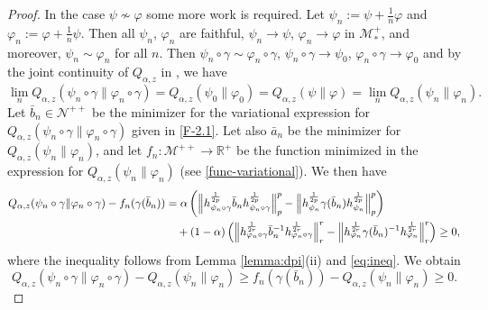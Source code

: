 \documentclass[12pt]{article}
\theoremstyle{definition}
\theoremstyle{remark}
\numberwithin{equation}{section}
\def\Me{\mathcal M}
\def\Ne{\mathcal N}
\def\ffi{\varphi}
\begin{document}
\begin{proof}
In the case $\psi\not\sim \ffi$ some more work is required. Let $\psi_n:=\psi+\frac1n \ffi$ and
$\ffi_n:=\ffi+\frac1n \psi$. Then all $\psi_n$, $\ffi_n$ are faithful,  $\psi_n\to \psi$, $\ffi_n\to \ffi$ in
$\Me_*^+$, {and} moreover,  $\psi_n\sim \ffi_n$ for all $n$. Then
$\psi_n\circ\gamma\sim \ffi_n\circ\gamma$, $\psi_n\circ\gamma\to \psi_0$,
$\ffi_n \circ \gamma\to \ffi_0$ and by the joint continuity of $Q_{\alpha,z}$ in
\cite[Theorem 1(iv)]{kato2023onrenyi}, we have
\[
\lim_n
Q_{\alpha,z}(\psi_n\circ\gamma\|\ffi_n\circ\gamma)=Q_{\alpha,z}(\psi_0\|\ffi_0)
=Q_{\alpha,z}(\psi\|\ffi)=\lim_nQ_{\alpha,z}(\psi_n\|\ffi_n).
\]
Let $\bar b_{n}\in \Ne^{++}$ be the minimizer for the variational expression for
$Q_{\alpha,z}(\psi_n\circ\gamma\|\ffi_n\circ\gamma)$ {given in \eqref{F-2.1}.}
Let also $\bar a_n$ be the minimizer for $Q_{\alpha,z}(\psi_n\|\ffi_n)$, and let
$f_n:\Me^{++}\to \mathbb R^+$ be the function minimized in the expression for
$Q_{\alpha,z}(\psi_n\|\ffi_n)$ {(see \eqref{func-variational}).} We then have 
\begin{align*}
Q_{\alpha,z}(\psi_n\circ\gamma\|\ffi_n\circ\gamma)-f_n(\gamma(\bar
b_{n}))&=\alpha\left(\Big\|h_{\psi_n\circ\gamma}^{\frac1{2p}}\bar b_{n}
h_{\psi_n\circ\gamma}^{\frac1{2p}}\Big\|_p^p-\Big\|h_{\psi_n}^{1\over 2p}\gamma(\bar
b_n)h_{\psi_n}^{1\over 2p}\Big\|_p^p\right)\\
&\quad + (1-\alpha)\left(\Big\|h_{\ffi_n\circ\gamma}^{\frac1{2r}}\bar b_{n}^{-1}
h_{\ffi_n\circ\gamma}^{\frac1{2r}}\Big\|_r^r-\Big\|h_{\ffi_n}^{1\over 2r}\gamma(\bar
b_n)^{-1}h_{\ffi_n}^{1\over 2r}\Big\|_r^r\right)\ge 0,
\end{align*}
where the inequality follows from Lemma \ref{lemma:dpi}(ii) and \eqref{eq:ineq}. We
obtain
\begin{equation}\label{eq:qfn}
Q_{\alpha,z}(\psi_n\circ\gamma\|\ffi_n\circ\gamma)-Q_{\alpha,z}(\psi_n\|\ffi_n)\ge f_n(\gamma(\bar
b_{n}))-Q_{\alpha,z}(\psi_n\|\ffi_n)\ge 0.
\end{equation}


\end{proof}
\end{document}
